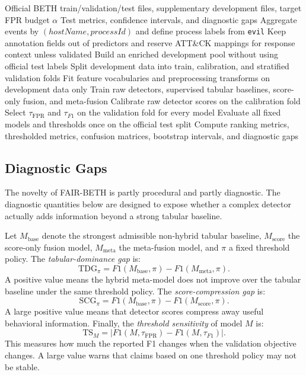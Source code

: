 \documentclass[10pt,journal,compsoc]{IEEEtran}
\begin{document}
\begin{algorithm}[t]
\caption{FAIR-BETH evaluation protocol}
\label{alg:fairbeth}
\begin{algorithmic}[1]
\Require Official BETH train/validation/test files, supplementary development files, target FPR budget $\alpha$
\Ensure Test metrics, confidence intervals, and diagnostic gaps
\State Aggregate events by $(hostName, processId)$ and define process labels from \texttt{evil}
\State Keep annotation fields out of predictors and reserve ATT\&CK mappings for response context unless validated
\State Build an enriched development pool without using official test labels
\State Split development data into train, calibration, and stratified validation folds
\State Fit feature vocabularies and preprocessing transforms on development data only
\State Train raw detectors, supervised tabular baselines, score-only fusion, and meta-fusion
\State Calibrate raw detector scores on the calibration fold
\State Select $\tau_{\mathrm{FPR}}$ and $\tau_{F1}$ on the validation fold for every model
\State Evaluate all fixed models and thresholds once on the official test split
\State Compute ranking metrics, thresholded metrics, confusion matrices, bootstrap intervals, and diagnostic gaps
\end{algorithmic}
\end{algorithm}

\subsection{Diagnostic Gaps}

The novelty of FAIR-BETH is partly procedural and partly diagnostic. The diagnostic quantities below are designed to expose whether a complex detector actually adds information beyond a strong tabular baseline.

Let $M_{\mathrm{base}}$ denote the strongest admissible non-hybrid tabular baseline, $M_{\mathrm{score}}$ the score-only fusion model, $M_{\mathrm{meta}}$ the meta-fusion model, and $\pi$ a fixed threshold policy. The \emph{tabular-dominance gap} is:
\[
\mathrm{TDG}_{\pi}=F1(M_{\mathrm{base}},\pi)-F1(M_{\mathrm{meta}},\pi).
\]
A positive value means the hybrid meta-model does not improve over the tabular baseline under the same threshold policy. The \emph{score-compression gap} is:
\[
\mathrm{SCG}_{\pi}=F1(M_{\mathrm{base}},\pi)-F1(M_{\mathrm{score}},\pi).
\]
A large positive value means that detector scores compress away useful behavioral information. Finally, the \emph{threshold sensitivity} of model $M$ is:
\[
\mathrm{TS}_{M}=|F1(M,\tau_{\mathrm{FPR}})-F1(M,\tau_{F1})|.
\]
This measures how much the reported F1 changes when the validation objective changes. A large value warns that claims based on one threshold policy may not be stable.
\end{document}
